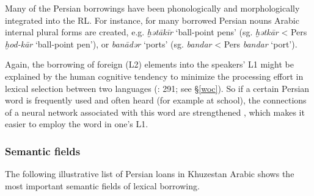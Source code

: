 \documentclass[output=paper,nonflat]{langsci/langscibook}
\begin{document}
Many of the Persian borrowings have been phonologically and morphologically integrated into the RL. For instance, for many borrowed Persian nouns Arabic internal plural forms are created, e.g. \textit{ḫətākīr} ‘ball-point pens’ (sg. \textit{ḫətkār} < Pers \textit{ḫod-kār} ‘ball-point pen’), or \textit{banādər} ‘ports’ (sg. \textit{bandar} < Pers \textit{bandar} ‘port’).

Again, the borrowing of foreign (L2) elements into the speakers’ L1 might be explained by the human cognitive tendency to minimize the processing effort in lexical selection between two languages (\citealt{Lucas2012}: 291; see §\ref{woc}). So if a certain Persian word is frequently used and often heard (for example at school), the connections of a neural network associated with this word are strengthened \citep[291]{Lucas2012}, which makes it easier to employ the word in one’s L1. 


\subsubsection{Semantic fields}

The following illustrative list of Persian loans in Khuzestan Arabic shows the most important semantic fields of lexical borrowing.
\end{document}
